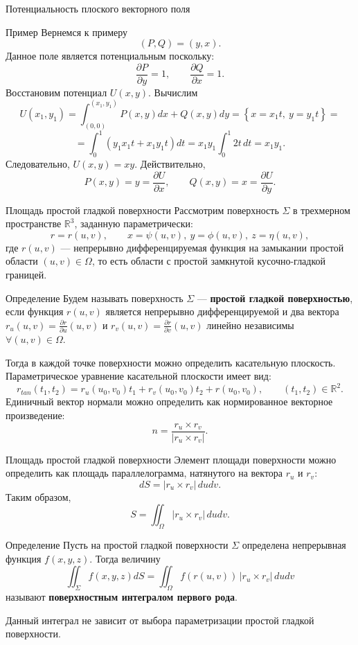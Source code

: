 \documentclass[8pt]{beamer}
\newcommand{\pp}[2]{\frac{\partial #1}{\partial #2}}
\newcommand{\ds}{\displaystyle}
\begin{document}
\begin{frame}{Потенциальность плоского векторного поля}
\begin{block}{Пример}
Вернемся к примеру
$$(P,Q) = (y, x).$$
Данное поле является потенциальным поскольку:
$$\pp{P}{y} = 1,\qquad \pp{Q}{x} = 1.$$
Восстановим потенциал $U(x,y)$. Вычислим
$$U(x_1,y_1) = \int_{(0,0)}^{(x_1, y_1)} P(x,y)dx+Q(x,y)dy = \left\{ x = x_1 t,\ y= y_1 t \right\} =$$
$$= \int_{0}^{1} (y_1 x_1 t+x_1 y_1 t) dt = x_1 y_1\int_0^1 2 t\,dt = x_1 y_1.$$
Следовательно, $U(x,y) = x y$. Действительно,
$$P(x,y) = y = \pp{U}{x},\qquad Q(x,y) = x = \pp{U}{y}.$$
\end{block}
\end{frame}

\begin{frame}{Площадь простой гладкой поверхности}
Рассмотрим поверхность $\Sigma$ в трехмерном пространстве $\mathbb{R}^3$, заданную параметрически:
$$r=r(u,v),\qquad x=\psi(u,v),\ y=\phi(u,v),\ z=\eta(u,v),$$
где $r(u,v)$ --- непрерывно дифференцируемая функция на замыкании простой области $(u,v)\in\Omega$, то есть области с простой замкнутой кусочно-гладкой границей. 
\begin{block}{Определение}
Будем называть поверхность $\Sigma$ --- {\bf простой гладкой поверхностью}, если функция $r(u,v)$ является непрерывно дифференцируемой и два вектора $\ds r_u(u,v) = \pp{r}{u}(u,v)$ и $\ds r_v(u,v)=\pp{r}{v}(u,v)$ линейно независимы $\forall (u,v)\in\Omega$.
\end{block}
Тогда в каждой точке поверхности можно определить касательную плоскость. Параметрическое уравнение касательной плоскости имеет вид:
$$r_{tan}(t_1,t_2) = r_u(u_0,v_0) t_1+r_v(u_0,v_0) t_2+r(u_0,v_0),\qquad (t_1,t_2)\in\mathbb{R}^2.$$
Единичный вектор нормали можно определить как нормированное векторное произведение:
$$n = \frac{r_u \times r_v}{|r_u \times r_v|}.$$
\end{frame}

\begin{frame}{Площадь простой гладкой поверхности}
Элемент площади поверхности можно определить как площадь параллелограмма, натянутого на вектора $r_u$ и $r_v$:
$$dS = | r_u \times r_v | \, du dv.$$
Таким образом,
$$S = \iint_{\Omega} | r_u \times r_v | \, du dv.$$
\begin{block}{Определение}
Пусть на простой гладкой поверхности $\Sigma$ определена непрерывная функция $f(x,y,z)$. Тогда величину
$$\iint_{\Sigma} f(x,y,z)dS = \iint_{\Omega} f(r(u,v))\,  | r_u \times r_v | \, du dv$$
называют {\bf поверхностным интегралом первого рода}.
\end{block}
Данный интеграл не зависит от выбора параметризации простой гладкой поверхности.
\end{frame}
\end{document}

